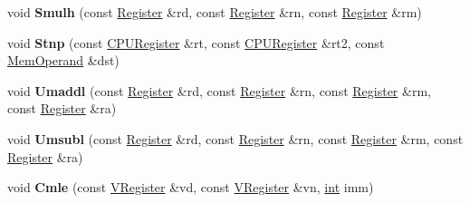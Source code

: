 \begin{DoxyCompactItemize}
\item 
\mbox{\label{classv8_1_1internal_1_1MacroAssembler_aa87b192f199809131b4ecd61fbf44aaa}} 
void {\bfseries Smulh} (const \mbox{\hyperlink{classv8_1_1internal_1_1Register}{Register}} \&rd, const \mbox{\hyperlink{classv8_1_1internal_1_1Register}{Register}} \&rn, const \mbox{\hyperlink{classv8_1_1internal_1_1Register}{Register}} \&rm)
\item 
\mbox{\label{classv8_1_1internal_1_1MacroAssembler_a0aeabae0a890d19eff833b42e6af8787}} 
void {\bfseries Stnp} (const \mbox{\hyperlink{classv8_1_1internal_1_1CPURegister}{C\+P\+U\+Register}} \&rt, const \mbox{\hyperlink{classv8_1_1internal_1_1CPURegister}{C\+P\+U\+Register}} \&rt2, const \mbox{\hyperlink{classv8_1_1internal_1_1MemOperand}{Mem\+Operand}} \&dst)
\item 
\mbox{\label{classv8_1_1internal_1_1MacroAssembler_a21d092ecc89ad3f425142644502ab4be}} 
void {\bfseries Umaddl} (const \mbox{\hyperlink{classv8_1_1internal_1_1Register}{Register}} \&rd, const \mbox{\hyperlink{classv8_1_1internal_1_1Register}{Register}} \&rn, const \mbox{\hyperlink{classv8_1_1internal_1_1Register}{Register}} \&rm, const \mbox{\hyperlink{classv8_1_1internal_1_1Register}{Register}} \&ra)
\item 
\mbox{\label{classv8_1_1internal_1_1MacroAssembler_a29a45ac99808f240332bbf8210e27489}} 
void {\bfseries Umsubl} (const \mbox{\hyperlink{classv8_1_1internal_1_1Register}{Register}} \&rd, const \mbox{\hyperlink{classv8_1_1internal_1_1Register}{Register}} \&rn, const \mbox{\hyperlink{classv8_1_1internal_1_1Register}{Register}} \&rm, const \mbox{\hyperlink{classv8_1_1internal_1_1Register}{Register}} \&ra)
\item 
\mbox{\label{classv8_1_1internal_1_1MacroAssembler_af96a7e6b460fe2d57719f8ff383e5419}} 
void {\bfseries Cmle} (const \mbox{\hyperlink{classv8_1_1internal_1_1VRegister}{V\+Register}} \&vd, const \mbox{\hyperlink{classv8_1_1internal_1_1VRegister}{V\+Register}} \&vn, \mbox{\hyperlink{classint}{int}} imm)
\item 
\mbox{\label{classv8_1_1internal_1_1MacroAssembler_acfb9fef53018508bba2527b09ecf3578}} 

\end{DoxyCompactItemize}
